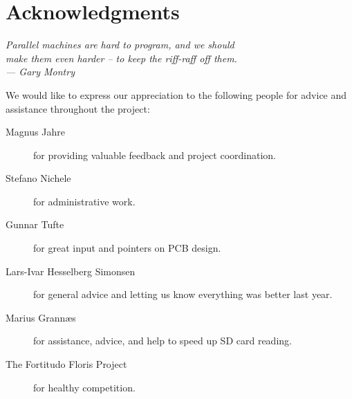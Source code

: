 
\bigskip

\begingroup
\let\clearpage\relax
\let\cleardoublepage\relax
\let\cleardoublepage\relax
\chapter*{Acknowledgments}
\begin{flushright}{\slshape
    Parallel machines are hard to program, and we should\\
    make them even harder -- to keep the riff-raff off them.\\ \medskip
    ---  Gary Montry}  %
\end{flushright}
\bigskip

We would like to express our appreciation to the following people for
advice and assistance throughout the project:

\begin{description} %
\item[Magnus Jahre] for providing valuable feedback and project coordination.
\item[Stefano Nichele] for administrative work.
\item[Gunnar Tufte] for great input and pointers on PCB design.
\item[Lars-Ivar Hesselberg Simonsen] for general advice and letting us know
  everything was better last year.
\item[Marius Grann{\ae}s] for assistance, advice, and help to speed up SD
  card reading.
\item[The Fortitudo Floris Project] for healthy competition.
\end{description}
\endgroup
